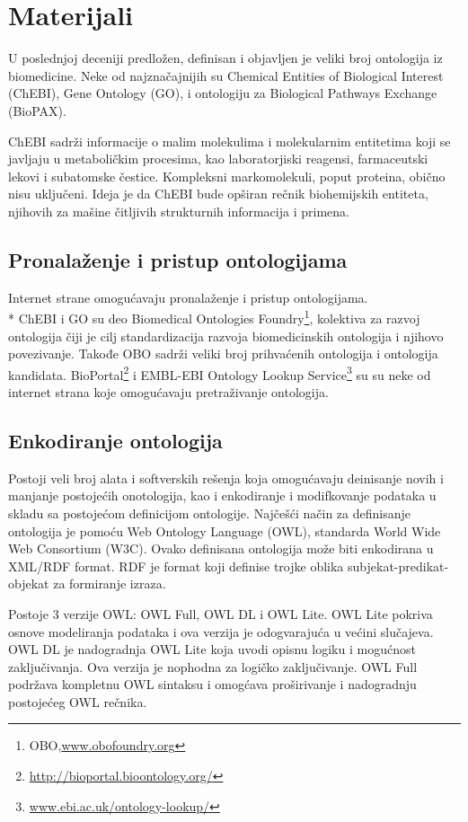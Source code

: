 \section{Materijali}

U poslednjoj deceniji predložen, definisan i objavljen je veliki broj ontologija iz biomedicine.
Neke od najznačajnijih su Chemical Entities of Biological Interest (ChEBI), Gene Ontology (GO), 
i ontologiju za Biological Pathways Exchange (BioPAX). \par
 ChEBI sadrži informacije o malim molekulima i molekularnim entitetima 
koji se javljaju u metaboličkim procesima, kao laboratorjiski reagensi, farmaceutski lekovi i subatomske čestice.
 Kompleksni markomolekuli, poput proteina, obično nisu uključeni. Ideja je da ChEBI bude opširan rečnik biohemijskih entiteta, njihovih
za mašine čitljivih strukturnih informacija i primena.

\subsection{Pronalaženje i pristup ontologijama}

Internet strane omogućavaju pronalaženje i pristup ontologijama.\\*
ChEBI i GO su deo Biomedical Ontologies Foundry\footnote{OBO,\url{www.obofoundry.org}}, kolektiva za razvoj ontologija čiji je cilj standardizacija razvoja biomedicinskih ontologija i njihovo povezivanje. 
Takođe OBO sadrži veliki broj prihvaćenih ontologija i ontologija kandidata.
BioPortal\footnote{ \url{http://bioportal.bioontology.org/}} i EMBL-EBI Ontology Lookup Service\footnote{ \url{www.ebi.ac.uk/ontology-lookup/}}
su su neke od internet strana koje omogućavaju pretraživanje ontologija.

\subsection{Enkodiranje ontologija}

Postoji veli broj alata i softverskih rešenja koja omogućavaju deinisanje novih i manjanje postojećih onotologija, kao i 
enkodiranje i modifkovanje podataka u skladu sa postojećom definicijom ontologije.
Najčešći način za definisanje ontologija je pomoću Web Ontology Language (OWL), standarda World Wide Web Consortium (W3C).
Ovako definisana ontologija može biti enkodirana u XML/RDF format. RDF je format koji definise trojke oblika subjekat-predikat-objekat
za formiranje izraza. \par
Postoje 3 verzije OWL: OWL Full, OWL DL i OWL Lite.
OWL Lite pokriva osnove modeliranja podataka i ova verzija je odogvarajuća u većini slučajeva.
OWL DL je nadogradnja OWL Lite koja uvodi opisnu logiku i mogućnost zaključivanja. Ova verzija je nophodna za logičko zaključivanje.
OWL Full podržava kompletnu OWL sintaksu i omogćava proširivanje i nadogradnju postojećeg OWL rečnika.

